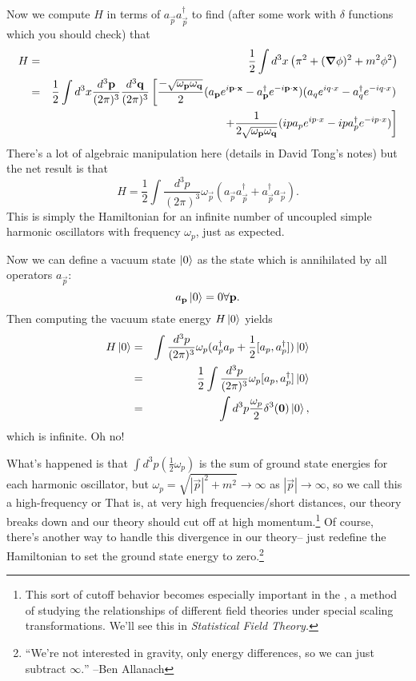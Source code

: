 Now we compute $H$ in terms of $a_{\vec p} a_{\vec p}^\dagger$ to find (after some work with $\delta$ functions which you should check) that
\begin{eqnarray*}
H&=&\frac{1}{2}\int d^3 x \left( \pi^2+(\mbox{\boldmath$ \nabla $} \phi)^2+m^2\phi^2\right)\\
&=& \frac{1}{2}\int d^3x \frac{d^3 \boldsymbol{\mathbf{p}}}{(2\pi)^3} \frac{d^3 \boldsymbol{\mathbf{q}}}{(2\pi)^3} \left[ \frac{-\sqrt{\omega_{\boldsymbol{\mathbf{p}}}\omega_{\boldsymbol{\mathbf{q}}}}}{2}(a_{\boldsymbol{\mathbf{p}}} e^{i\boldsymbol{\mathbf{p}} \cdot \boldsymbol{\mathbf{x}}}-a^\dagger_{\boldsymbol{\mathbf{p}}} e^{-i \boldsymbol{\mathbf{p}} \cdot \boldsymbol{\mathbf{x}}})(a_q e^{iq \cdot x}-a_q^\dagger e^{-i q\cdot x})\right.\\
&&\left.+\frac{1}{2\sqrt{\omega_{\boldsymbol{\mathbf{p}}}\omega_{\boldsymbol{\mathbf{q}}}}}(ip a_p e^{ip\cdot x}-ip a_p^\dagger e^{-i p\cdot x}) \right]
\end{eqnarray*}
There's a lot of algebraic manipulation here (details in David Tong's notes) but the net result is that
$$H=\frac{1}{2} \int \frac{d^3p}{(2\pi)^3} \omega_{\vec p}(a_{\vec p} a_{\vec p}^\dagger + a_{\vec p}^\dagger a_{\vec p}).$$
This is simply the Hamiltonian for an infinite number of uncoupled simple harmonic oscillators with frequency $\omega_p$, just as expected.

Now we can define a vacuum state $\left| 0 \right>$ as the state which is annihilated by all operators $a_{\vec p}$: 
$$a_{\boldsymbol{\mathbf{p}}}\left| 0 \right>=0 \forall \boldsymbol{\mathbf{p}}.$$
Then computing the vacuum state energy $H\left| 0 \right>$ yields
\begin{eqnarray*}
H\left| 0 \right>&=&\int \frac{d^3p}{(2\pi)^3}\omega_p (a_p^\dagger a_p + \frac{1}{2}[a_p, a_p^\dagger])\left| 0 \right>\\
&=&\frac{1}{2}\int \frac{d^3 p}{(2\pi)^3}\omega_p [a_p, a^\dagger_p] \left| 0 \right>\\
&=& \int d^3 p \frac{\omega_p}{2} \delta^3 (\boldsymbol{\mathbf{0}})\left| 0 \right>,
\end{eqnarray*}
which is infinite. Oh no!

What's happened is that $\int d^3p \left(\frac{1}{2}\omega_p\right)$ is the sum of ground state energies for each harmonic oscillator, but $\omega_p =\sqrt{|\vec p|^2 + m^2} \to \infty$ as $|\vec p|\to \infty$, so we call this a high-frequency or  That is, at very high frequencies/short distances, our theory breaks down and our theory should cut off at high momentum.\footnote{This sort of cutoff behavior becomes especially important in the , a method of studying the relationships of different field theories under special scaling transformations. We'll see this in \emph{Statistical Field Theory.}} Of course, there's another way to handle this divergence in our theory-- just redefine the Hamiltonian to set the ground state energy to zero.\footnote{``We're not interested in gravity, only energy differences, so we can just subtract $\infty.$'' --Ben Allanach}


